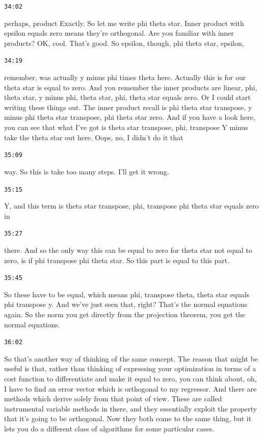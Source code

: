 \documentclass[11pt,a4paper]{article}
\newcommand{\timestamp}[1]{%
  \par\vspace{0.35em}%
  \noindent\colorbox{timestampback}{\textcolor{timestampblue}{\small\texttt{#1}}}%
  \par\vspace{0.2em}%
}
\begin{document}
\timestamp{34:02}

perhaps, product Exactly. So let me write phi theta star. Inner product with epsilon equals zero means they're orthogonal. Are you familiar with inner products? OK, cool. That's good. So epsilon, though, phi theta star, epsilon,



\timestamp{34:19}

remember, was actually y minus phi times theta here. Actually this is for our theta star is equal to zero. And you remember the inner products are linear, phi, theta star, y minus phi, theta star, phi, theta star equals zero. Or I could start writing these things out. The inner product recall is phi theta star transpose, y minus phi theta star transpose, phi theta star zero. And if you have a look here, you can see that what I've got is theta star transpose, phi, transpose Y minus take the theta star out here. Oops, no, I didn't do it that



\timestamp{35:09}

way. So this is take too many steps. I'll get it wrong.



\timestamp{35:15}

Y, and this term is theta star transpose, phi, transpose phi theta star equals zero in



\timestamp{35:27}

there. And so the only way this can be equal to zero for theta star not equal to zero, is if phi transpose phi theta star. So this part is equal to this part.



\timestamp{35:45}

So these have to be equal, which means phi, transpose theta, theta star equals phi transpose y. And we've just seen that, right? That's the normal equations again. So the norm you get directly from the projection theorem, you get the normal equations.



\timestamp{36:02}

So that's another way of thinking of the same concept. The reason that might be useful is that, rather than thinking of expressing your optimization in terms of a cost function to differentiate and make it equal to zero, you can think about, oh, I have to find an error vector which is orthogonal to my regressor. And there are methods which derive solely from that point of view. These are called instrumental variable methods in there, and they essentially exploit the property that it's going to be orthogonal. Now they both come to the same thing, but it lets you do a different class of algorithms for some particular cases.
\end{document}
